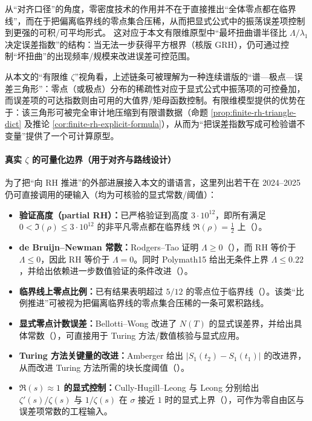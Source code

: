 从“对齐口径”的角度，零密度技术的作用并不在于直接推出“全体零点都在临界线”，而在于把偏离临界线的零点集合压稀，从而把显式公式中的振荡误差项控制到更强的可积/可平均形式。
这对应于本文有限维原型中“最坏扭曲谱半径比 $\Lambda/\lambda_1$ 决定误差指数”的结构：当无法一步获得平方根界（核版 GRH），仍可通过控制“坏扭曲”的出现频率/规模来改进误差可控范围。

从本文的“有限维 \(\zeta\)”视角看，上述链条可被理解为一种连续谱版的“谱—极点—误差三角形”：零点（或极点）分布的稀疏性对应于显式公式中振荡项的可控叠加，而误差项的可达指数则由可用的大值界/矩母函数控制。有限维模型提供的优势在于：该三角形可被完全审计地压缩到有限谱数据（命题 \ref{prop:finite-rh-triangle-dict} 及推论 \ref{cor:finite-rh-explicit-formula}），从而为“把误差指数写成可检验谱不变量”提供了一个可计算原型。

\paragraph{真实 \texorpdfstring{$\zeta$}{zeta} 的可量化边界（用于对齐与路线设计）}
为了把“向 RH 推进”的外部进展接入本文的谱语言，这里列出若干在 2024--2025 仍可直接调用的硬输入（均为可核验的显式常数/阈值）：
\begin{itemize}
  \item \textbf{验证高度（partial RH）：}已严格验证到高度 \(3\cdot 10^{12}\)，即所有满足 \(0<\Im(\rho)\le 3\cdot 10^{12}\) 的非平凡零点都在临界线 \(\Re(\rho)=\tfrac12\) 上（\cite{PlattTrudgian2020RH3e12}）。
  \item \textbf{de Bruijn--Newman 常数：}Rodgers--Tao 证明 \(\Lambda\ge 0\)（\cite{RodgersTao2018NewmanNonnegative}），而 RH 等价于 \(\Lambda\le 0\)，因此 RH 等价于 \(\Lambda=0\)。同时 Polymath15 给出无条件上界 \(\Lambda\le 0.22\)，并给出依赖进一步数值验证的条件改进（\cite{Polymath2019NewmanUpper}）。
  \item \textbf{临界线上零点比例：}已有结果表明超过 \(5/12\) 的零点位于临界线（\cite{PrattRoblesZaharescuZeindler2018FiveTwelfths}）。该类“比例推进”可被视为把偏离临界线的零点集合压稀的一条可累积路线。
  \item \textbf{显式零点计数误差：}Bellotti--Wong 改进了 \(N(T)\) 的显式误差界，并给出具体常数（\cite{BellottiWong2024ImprovedNT}），可直接用于 Turing 方法/数值核验与显式应用。
  \item \textbf{Turing 方法关键量的改进：}Amberger 给出 \(|S_1(t_2)-S_1(t_1)|\) 的改进界，从而改进 Turing 方法所需的块长度阈值（\cite{Amberger2025S1}）。
  \item \textbf{\(\Re(s)\approx 1\) 的显式控制：}Cully-Hugill--Leong 与 Leong 分别给出 \(\zeta'(s)/\zeta(s)\) 与 \(1/\zeta(s)\) 在 \(\sigma\) 接近 \(1\) 时的显式上界（\cite{CullyHugillLeong2023Zeta1Line,Leong2024LogDerivRecip}），可作为零自由区与误差项常数的工程输入。
\end{itemize}

